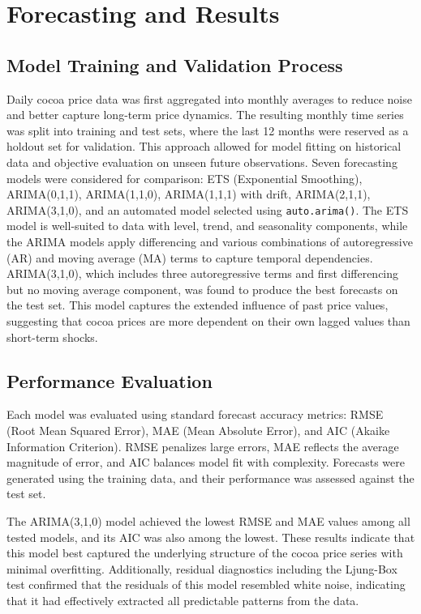\chapter{Forecasting and Results}
\label{ch:evaluation}

\section{Model Training and Validation Process}
Daily cocoa price data was first aggregated into monthly averages to reduce noise and better capture long-term price dynamics. The resulting monthly time series was split into training and test sets, where the last 12 months were reserved as a holdout set for validation. This approach allowed for model fitting on historical data and objective evaluation on unseen future observations. Seven forecasting models were considered for comparison: ETS (Exponential Smoothing), ARIMA(0,1,1), ARIMA(1,1,0), ARIMA(1,1,1) with drift, ARIMA(2,1,1), ARIMA(3,1,0), and an automated model selected using \texttt{auto.arima()}. The ETS model is well-suited to data with level, trend, and seasonality components, while the ARIMA models apply differencing and various combinations of autoregressive (AR) and moving average (MA) terms to capture temporal dependencies. ARIMA(3,1,0), which includes three autoregressive terms and first differencing but no moving average component, was found to produce the best forecasts on the test set. This model captures the extended influence of past price values, suggesting that cocoa prices are more dependent on their own lagged values than short-term shocks.

\section{Performance Evaluation}
Each model was evaluated using standard forecast accuracy metrics: RMSE (Root Mean Squared Error), MAE (Mean Absolute Error), and AIC (Akaike Information Criterion). RMSE penalizes large errors, MAE reflects the average magnitude of error, and AIC balances model fit with complexity. Forecasts were generated using the training data, and their performance was assessed against the test set.

The ARIMA(3,1,0) model achieved the lowest RMSE and MAE values among all tested models, and its AIC was also among the lowest. These results indicate that this model best captured the underlying structure of the cocoa price series with minimal overfitting. Additionally, residual diagnostics including the Ljung-Box test confirmed that the residuals of this model resembled white noise, indicating that it had effectively extracted all predictable patterns from the data.

